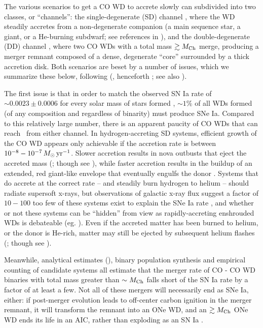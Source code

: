 The various scenarios to get a CO WD to accrete slowly can subdivided into two classes, or ``channels'': the single-degenerate (SD) channel \citep{wheli73}, where the WD steadily accretes from a non-degenerate companion (a main sequence star, a giant, or a He-burning subdwarf; see references in \citealt{maozns14}), and the double-degenerate (DD) channel \citep{ibent84, webb84}, where two CO WDs with a total mass $\gtrsim\Mch$ merge, producing a merger remnant composed of a dense, degenerate ``core'' surrounded by a thick accretion disk.  Both scenarios are beset by a number of issues, which we summarize these below, following \citeauthor{vkercj10} (\citeyear{vkercj10}, henceforth \citeal{vkercj10}; see also \citealt{vker13}).

The first issue is that in order to match the observed SN Ia rate of $\sim 0.0023 \pm 0.0006$ for every solar mass of stars formed \citep{mann+05}, $\sim1$\% of all WDs formed (of any composition and regardless of binarity) must produce SNe Ia.  Compared to this relatively large number, there is an apparent paucity of CO WDs that can reach \Mch\ from either channel.  In hydrogen-accreting SD systems, efficient growth of the CO WD appears only achievable if the accretion rate is between $10^{-8} - 10^{-7}\,\Msun\,\pyr$.  Slower accretion results in nova outbusts that eject the accreted mass (\citealt{townsb04}; though see \citealt{zorosg11}), while faster accretion results in the buildup of an extended, red giant-like envelope that eventually engulfs the donor \citep{ibent84}.  Systems that do accrete at the correct rate -- and steadily burn hydrogen to helium -- should radiate supersoft x-rays, but observations of galactic x-ray flux suggest a factor of $10 - 100$ too few of these systems exist to explain the SNe Ia rate \citep{dist10, gilfb10}, and whether or not these systems can be ``hidden'' from view as rapidly-accreting enshrouded WDs is debateable (eg. \citealt{hachkn10, joha+14}).  Even if the accreted matter has been burned to helium, or the donor is He-rich, matter may still be ejected by subsequent helium flashes (\citealt{idanss13}; though see \citealt{hill+16}).  

Meanwhile, analytical estimates (\citealt{vkercj10}), binary population synthesis \citep{menn+10, ruitbf09, clae+14} and empirical counting of candidate systems \citep{badem12} all estimate that the merger rate of CO - CO WD binaries with total mass greater than $\sim\Mch$ falls short of the SN Ia rate by a factor of at least a few.  Not all of these mergers will necessarily end as SNe Ia, either: if post-merger evolution leads to off-center carbon ignition in the merger remnant, it will transform the remnant into an ONe WD, and an $\gtrsim\Mch$ ONe WD ends its life in an AIC, rather than exploding as an SN Ia \citep{nomoi85, saion85, yoonpr07, schw+12, schw+15}.
 
